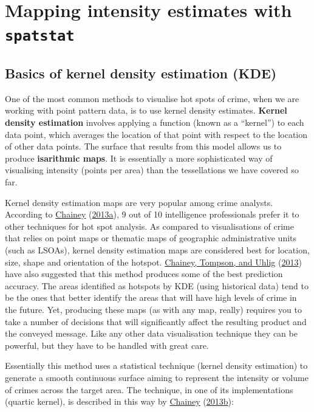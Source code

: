 \documentclass[
  krantz2]{krantz}
\begin{document}
\hypertarget{mapping-intensity-estimates-with-spatstat}{%
\section{\texorpdfstring{Mapping intensity estimates with \texttt{spatstat}}{Mapping intensity estimates with spatstat}}\label{mapping-intensity-estimates-with-spatstat}}

\hypertarget{basics-of-kernel-density-estimation-kde}{%
\subsection{Basics of kernel density estimation (KDE)}\label{basics-of-kernel-density-estimation-kde}}

One of the most common methods to visualise hot spots of crime, when we are working with point pattern data, is to use kernel density estimates. \textbf{Kernel density estimation} involves applying a function (known as a ``kernel'') to each data point, which averages the location of that point with respect to the location of other data points. The surface that results from this model allows us to produce \textbf{isarithmic maps}. It is essentially a more sophisticated way of visualising intensity (points per area) than the tessellations we have covered so far.

Kernel density estimation maps are very popular among crime analysts. According to \protect\hyperlink{ref-Chainey_2013a}{Chainey} (\protect\hyperlink{ref-Chainey_2013a}{2013a}), 9 out of 10 intelligence professionals prefer it to other techniques for hot spot analysis. As compared to visualisations of crime that relies on point maps or thematic maps of geographic administrative units (such as LSOAs), kernel density estimation maps are considered best for location, size, shape and orientation of the hotspot. \protect\hyperlink{ref-Chainey_2008}{Chainey, Tompson, and Uhlig} (\protect\hyperlink{ref-Chainey_2008}{2013}) have also suggested that this method produces some of the best prediction accuracy. The areas identified as hotspots by KDE (using historical data) tend to be the ones that better identify the areas that will have high levels of crime in the future. Yet, producing these maps (as with any map, really) requires you to take a number of decisions that will significantly affect the resulting product and the conveyed message. Like any other data visualisation technique they can be powerful, but they have to be handled with great care.

Essentially this method uses a statistical technique (kernel density estimation) to generate a smooth continuous surface aiming to represent the intensity or volume of crimes across the target area. The technique, in one of its implementations (quartic kernel), is described in this way by \protect\hyperlink{ref-Chainey_2013b}{Chainey} (\protect\hyperlink{ref-Chainey_2013b}{2013b}):
\end{document}
